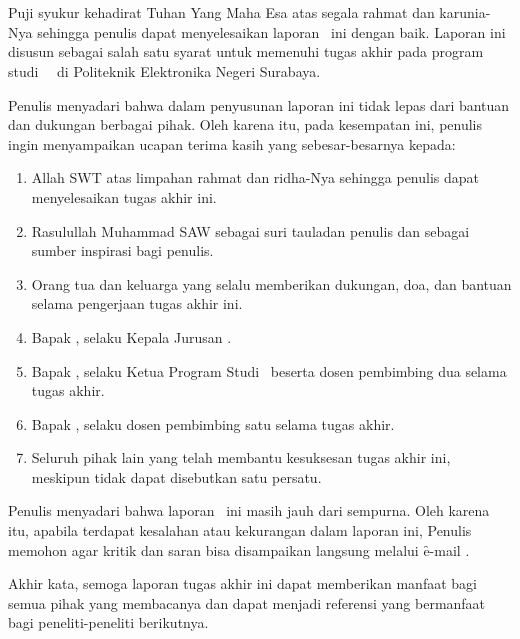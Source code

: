 %
%
%


\chapter*{\KataPengantar}


{

  \hspace*{1.0cm}
  Puji syukur kehadirat Tuhan Yang Maha Esa atas segala rahmat dan karunia-Nya sehingga penulis dapat menyelesaikan laporan \type\ ini dengan baik. Laporan ini disusun sebagai salah satu syarat untuk memenuhi tugas akhir pada program studi \jenjang\ \prodi\ di Politeknik Elektronika Negeri Surabaya.

  Penulis menyadari bahwa dalam penyusunan laporan ini tidak lepas dari bantuan dan dukungan berbagai pihak. Oleh karena itu, pada kesempatan ini, penulis ingin menyampaikan ucapan terima kasih yang sebesar-besarnya kepada:

  \begin{enumerate}[topsep=0pt,itemsep=-1ex,partopsep=0ex,parsep=1ex]
    \item Allah SWT atas limpahan rahmat dan ridha-Nya sehingga penulis dapat menyelesaikan tugas akhir ini.
    \item Rasulullah Muhammad SAW sebagai suri tauladan penulis dan sebagai sumber inspirasi bagi penulis.
    \item Orang tua dan keluarga yang selalu memberikan dukungan, doa, dan bantuan selama pengerjaan tugas akhir ini.
    \item Bapak \kajur, selaku Kepala Jurusan \jurusan.
    \item Bapak \kaprodi, selaku Ketua Program Studi \prodi\ beserta dosen pembimbing dua selama tugas akhir.
    \item Bapak \pembimbingSatu, selaku dosen pembimbing satu selama tugas akhir.
    \item Seluruh pihak lain yang telah membantu kesuksesan tugas akhir ini, meskipun tidak dapat disebutkan satu persatu.
  \end{enumerate}

  Penulis menyadari bahwa laporan \type\ ini masih jauh dari sempurna. Oleh karena itu, apabila terdapat kesalahan atau kekurangan dalam laporan ini, Penulis memohon agar kritik dan saran bisa disampaikan langsung melalui \f{e-mail} .

  Akhir kata, semoga laporan tugas akhir ini dapat memberikan manfaat bagi semua pihak yang membacanya dan dapat menjadi referensi yang bermanfaat bagi peneliti-peneliti berikutnya.
}

